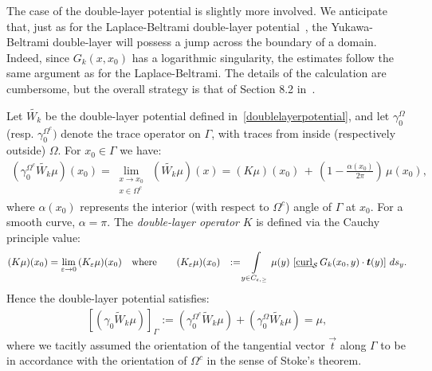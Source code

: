 The case of the double-layer potential is slightly more involved. We
anticipate that, just as for the Laplace-Beltrami double-layer
potential~\cite{gemmrich}, the Yukawa-Beltrami double-layer will possess
a jump across the boundary of a domain.  Indeed, since $G_k(x,x_0)$ has
a logarithmic singularity, the estimates follow the same argument as for
the Laplace-Beltrami. The details of the calculation are cumbersome, but
the overall strategy is that of Section 8.2 in~\cite{hackbusch}.

\begin{lemma} 
\label{l:DLPjump} 
Let $\widetilde{W_k}$ be the double-layer potential defined
in~\eqref{doublelayerpotential}, and let $\gamma_0^{\Omega}$ (resp.
$\gamma_0^{\Omega^c})$ denote the trace operator on $\Gamma$, with
traces from inside (respectively outside) $\Omega$.  For $x_{0} \in
\Gamma$ we have:
\begin{align*} 
  (\gamma^{\Omega^{c}}_0\widetilde{W_k}\mu)(x_0)=
  \lim\limits_{\substack{x \to x_0 \\ x \in \Omega^{c}}}\, 
  (\widetilde{W_k}\mu)(x) =
  (K\mu)(x_0)\,+\,\left(1-\frac{\alpha(x_0)}{2\pi}\right)\,\mu(x_0),
\end{align*}
where $\alpha(x_{0})$ represents the interior (with respect to
$\Omega^{c}$) angle of $\Gamma$ at $x_{0}$. For a smooth curve, $\alpha
= \pi$. The {\it double-layer operator} $K$ is defined via the Cauchy
principle value: 
\begin{align*}
  (K\mu)(x_0)&=\lim_{\varepsilon\rightarrow 0}
  \, (K_{\varepsilon}\mu)(x_0) \quad \mbox{where}\qquad
  (K_{\varepsilon}\mu)(x_0)&:=\int\limits_{y\in C_{\epsilon,\geq}} 
  \mu(y)\,\left[\underline{\mbox{curl}}_{\S}
  \,G_k(x_{0},y)\cdot\vec{t}(y)\right]\,ds_{y}.
\end{align*}
Hence the double-layer potential satisfies:
\begin{align*}
  \left[(\gamma_0\widetilde W_k\mu) \right]_\Gamma := 
  (\gamma^{\Omega^{c}}_0\widetilde W_k\mu)+(\gamma^{\Omega}_{0} 
  \widetilde{W_k}\mu)=\mu,
\end{align*}
where we tacitly assumed the orientation of the tangential vector
$\vec{t}$ along $\Gamma$ to be in accordance with the orientation of
$\Omega^{c}$ in the sense of Stoke's theorem.

\end{lemma}

